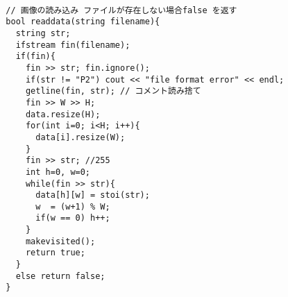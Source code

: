   
\begin{lstlisting}[basicstyle=\ttfamily\footnotesize, frame=single]

  // 画像の読み込み ファイルが存在しない場合false を返す
  bool readdata(string filename){
    string str;
    ifstream fin(filename);
    if(fin){
      fin >> str; fin.ignore();
      if(str != "P2") cout << "file format error" << endl;
      getline(fin, str); // コメント読み捨て
      fin >> W >> H; 
      data.resize(H);
      for(int i=0; i<H; i++){
        data[i].resize(W);
      }
      fin >> str; //255
      int h=0, w=0;
      while(fin >> str){
        data[h][w] = stoi(str);
        w  = (w+1) % W;
        if(w == 0) h++; 
      }
      makevisited();
      return true;
    }
    else return false;
  }

   \end{lstlisting}